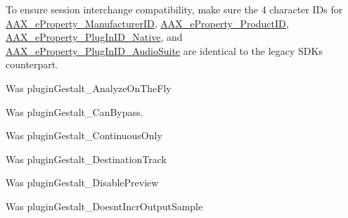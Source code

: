 \begin{DoxyRefList}
To ensure session interchange compatibility, make sure the 4 character I\+Ds for \hyperlink{a00283_a6571f4e41a5dd06e4067249228e2249ea996465cca29a2a15291d1c788ac5728c}{A\+A\+X\+\_\+e\+Property\+\_\+\+Manufacturer\+I\+D}, \hyperlink{a00283_a6571f4e41a5dd06e4067249228e2249ea3a41fcdff5af1a4fd19dcbca7b1ba6f3}{A\+A\+X\+\_\+e\+Property\+\_\+\+Product\+I\+D}, \hyperlink{a00283_a6571f4e41a5dd06e4067249228e2249ea89ca3dd6e96895cda14976c1b1ceb826}{A\+A\+X\+\_\+e\+Property\+\_\+\+Plug\+In\+I\+D\+\_\+\+Native}, and \hyperlink{a00283_a6571f4e41a5dd06e4067249228e2249ead3344696b8298a8b254add3d039ea927}{A\+A\+X\+\_\+e\+Property\+\_\+\+Plug\+In\+I\+D\+\_\+\+Audio\+Suite} are identical to the legacy S\+D\+K\textquotesingle{}s counterpart. 
\item[\label{a00385__porting_notes000050}%
\hypertarget{a00385__porting_notes000050}{}%
global\+Scope$>$ Member \hyperlink{a00283_a6571f4e41a5dd06e4067249228e2249ea9524773361ca8e712bef3547e8c46c9b}{A\+A\+X\+\_\+e\+Property\+\_\+\+Allow\+Preview\+Without\+Analysis} ]Was plugin\+Gestalt\+\_\+\+Analyze\+On\+The\+Fly  
\item[\label{a00385__porting_notes000046}%
\hypertarget{a00385__porting_notes000046}{}%
global\+Scope$>$ Member \hyperlink{a00283_a6571f4e41a5dd06e4067249228e2249ea6819867a9e86913e59decf318416d755}{A\+A\+X\+\_\+e\+Property\+\_\+\+Can\+Bypass} ]Was plugin\+Gestalt\+\_\+\+Can\+Bypass. 
\item[\label{a00385__porting_notes000053}%
\hypertarget{a00385__porting_notes000053}{}%
global\+Scope$>$ Member \hyperlink{a00283_a6571f4e41a5dd06e4067249228e2249ea95054276be8782d93437cd74669366d0}{A\+A\+X\+\_\+e\+Property\+\_\+\+Continuous\+Only} ]Was plugin\+Gestalt\+\_\+\+Continuous\+Only  
\item[\label{a00385__porting_notes000051}%
\hypertarget{a00385__porting_notes000051}{}%
global\+Scope$>$ Member \hyperlink{a00283_a6571f4e41a5dd06e4067249228e2249eadd8839e5678c8880215e318197cc8d3a}{A\+A\+X\+\_\+e\+Property\+\_\+\+Destination\+Track} ]Was plugin\+Gestalt\+\_\+\+Destination\+Track  
\item[\label{a00385__porting_notes000055}%
\hypertarget{a00385__porting_notes000055}{}%
global\+Scope$>$ Member \hyperlink{a00283_a6571f4e41a5dd06e4067249228e2249ea854fdc19ab908b67aa3bc1f4262aa288}{A\+A\+X\+\_\+e\+Property\+\_\+\+Disable\+Preview} ]Was plugin\+Gestalt\+\_\+\+Disable\+Preview  
\item[\label{a00385__porting_notes000057}%
\hypertarget{a00385__porting_notes000057}{}%
global\+Scope$>$ Member \hyperlink{a00283_a6571f4e41a5dd06e4067249228e2249eaaf6b47f0861af74ef5c5bb316481b97d}{A\+A\+X\+\_\+e\+Property\+\_\+\+Doesnt\+Incr\+Output\+Sample} ]Was plugin\+Gestalt\+\_\+\+Doesnt\+Incr\+Output\+Sample  

\end{DoxyRefList}
